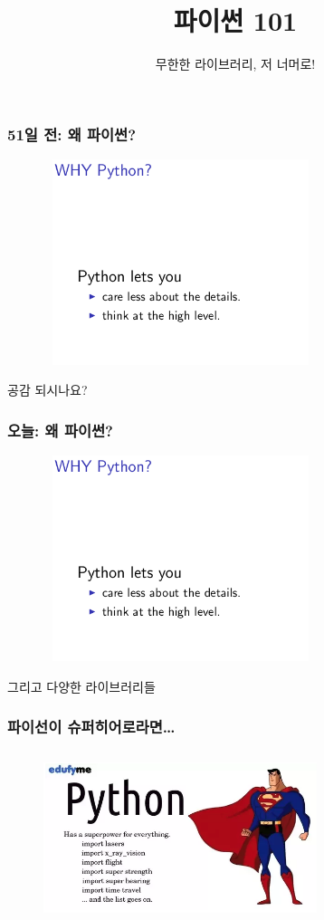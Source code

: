 \documentclass{beamer}
\title{파이썬 101}
\subtitle{무한한 라이브러리, 저 너머로!}
\begin{document}
\frame{\titlepage}

\begin{frame}
\frametitle{51일 전: 왜 파이썬?}
\begin{figure}[H]
  \centering
  \includegraphics[width=80mm,height=60mm]{recap.png}
\end{figure}
공감 되시나요?
\end{frame}

\begin{frame}
  \frametitle{오늘: 왜 파이썬?}
\begin{figure}[H]
  \centering
  \includegraphics[width=80mm,height=60mm]{recap.png}
\end{figure}
  그리고 다양한 라이브러리들
\end{frame}

\begin{frame}
\frametitle{파이선이 슈퍼히어로라면\ldots}
\begin{figure}[H]
  \centering
  \includegraphics[width=80mm,height=50mm]{hero.png}
\end{figure}
\end{frame}
\end{document}
